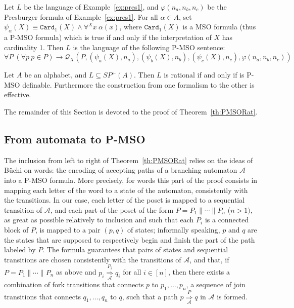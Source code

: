 \documentclass{CSML}
\begin{document}
 \begin{exa}
   \label{ex:pmso1}
   Let $L$ be the language of Example~\ref{ex:pres1}, and $\varphi(n_a,n_b,n_c)$ be the Presburger formula of Example~\ref{ex:pres1}.
   For all $\alpha\in A$, set
   $\psi_\alpha(X)\equiv\texttt{Card}_1(X)\land\forall^X x\ \alpha(x)$,
   where $\texttt{Card}_1(X)$ is a MSO formula (thus a P-MSO formula) which is true if and only if the interpretation of $X$ has cardinality 1. 
   Then $L$ is the language of the following P-MSO sentence:
     $$\forall P\ (\forall p\ p\in P)\rightarrow \mathcal{Q}_X(P,(\psi_a(X),n_a),(\psi_b(X),n_b),(\psi_c(X),n_c),\varphi(n_a,n_b,n_c))$$
 \end{exa}

\begin{thm}
  \label{th:PMSORat}
  Let $A$ be an alphabet, and $L\subseteq SP^+(A)$.
  Then $L$ is rational if and only if is P-MSO definable.
  Furthermore the construction from one formalism to the other is effective.
\end{thm}

The remainder of this Section is devoted to the proof of Theorem~\ref{th:PMSORat}.

\subsection{From automata to P-MSO}

The inclusion from left to right of Theorem~\ref{th:PMSORat} relies on the ideas of B\"uchi on words: the encoding of accepting paths of a branching automaton $\mathcal{A}$ into a P-MSO formula.
More precisely, for words this part of the proof consists in mapping each letter of the word to a state of the automaton, consistently with the transitions. In our case, each letter of the poset is mapped to a sequential transition of $\mathcal{A}$, and each part of the poset of the form $P=P_1\parallel\cdots\parallel P_n$ ($n>1)$, as great as possible relatively to inclusion and such that each $P_i$ is a connected block of $P$, is mapped to a pair $(p,q)$ of states; informally speaking, $p$ and $q$ are the states that are supposed to respectively begin and finish the part of the path labeled by $P$. The formula guarantees that pairs of states and sequential transitions are chosen consistently with the transitions of $\mathcal{A}$, and that, if $P=P_1\parallel\cdots\parallel P_n$ as above and $p_i \mathop{\Longrightarrow}\limits_{\mathcal{A}}^{P_i} q_i$ for all $i\in[n]$, then there exists a combination of fork transitions that connects $p$ to $p_1,\dots,p_n$, a sequence of join transitions that connects $q_1,\dots,q_n$ to $q$, such that a path $p \mathop{\Longrightarrow}\limits_{\mathcal{A}}^{P} q$ in $\mathcal{A}$ is formed.
\end{document}
